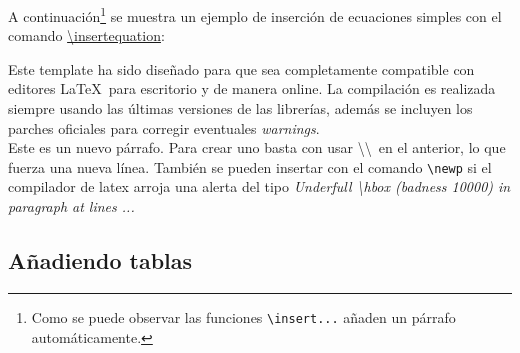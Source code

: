 

	A continuación\footnote{Como se puede observar las funciones \texttt{\textbackslash insert...} añaden un párrafo automáticamente.} se muestra un ejemplo de inserción de ecuaciones simples con el comando \href{https://latex.ppizarror.com/informe.html#hlp-formulae}{\textbackslash insertequation}:


	Este template \cite{template} ha sido diseñado para que sea completamente compatible con editores \LaTeX\ para escritorio y de manera online. La compilación es realizada siempre usando las últimas versiones de las librerías, además se incluyen los parches oficiales para corregir eventuales \textit{warnings}. \\

	Este es un nuevo párrafo. Para crear uno basta con usar \textbackslash\textbackslash\ en el anterior, lo que fuerza una nueva línea. También se pueden insertar con el comando \texttt{\textbackslash newp} si el compilador de latex arroja una alerta del tipo \textit{Underfull \textbackslash hbox (badness 10000) in paragraph at lines ...}

\subsection{Añadiendo tablas}


